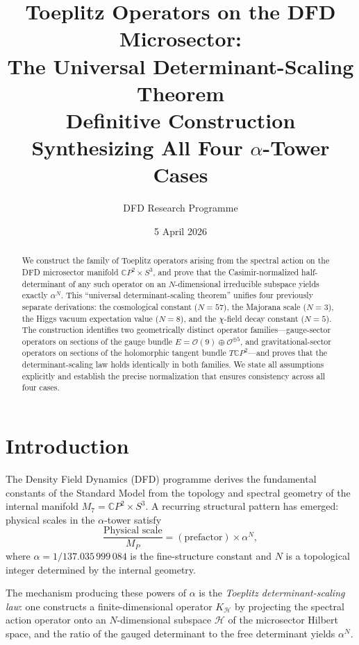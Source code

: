 \documentclass[11pt]{article}
\title{Toeplitz Operators on the DFD Microsector:\\
The Universal Determinant-Scaling Theorem\\[6pt]
\large Definitive Construction Synthesizing All Four $\alpha$-Tower Cases}
\author{DFD Research Programme}
\date{5 April 2026}
\theoremstyle{definition}
\theoremstyle{remark}
\newcommand{\CP}{\mathbb{C}P}
\newcommand{\Mp}{M_P}
\begin{document}
\maketitle

\begin{abstract}
We construct the family of Toeplitz operators arising from the spectral
action on the DFD microsector manifold $\CP^2 \times S^3$, and prove that
the Casimir-normalized half-determinant of any such operator on an
$N$-dimensional irreducible subspace yields exactly $\alpha^N$. This
``universal determinant-scaling theorem'' unifies four previously
separate derivations: the cosmological constant ($N = 57$), the Majorana
scale ($N = 3$), the Higgs vacuum expectation value ($N = 8$), and the
$\chi$-field decay constant ($N = 5$). The construction identifies two
geometrically distinct operator families---gauge-sector operators on
sections of the gauge bundle $E = \mathcal{O}(9) \oplus \mathcal{O}^{\oplus 5}$,
and gravitational-sector operators on sections of the holomorphic tangent
bundle $T\CP^2$---and proves that the determinant-scaling law holds
identically in both families. We state all assumptions explicitly and
establish the precise normalization that ensures consistency across all
four cases.
\end{abstract}

\tableofcontents

\section{Introduction}
\label{sec:intro}

The Density Field Dynamics (DFD) programme derives the fundamental
constants of the Standard Model from the topology and spectral geometry
of the internal manifold $M_7 = \CP^2 \times S^3$. A recurring
structural pattern has emerged: physical scales in the $\alpha$-tower
satisfy
\begin{equation}
\label{eq:alpha-tower}
\frac{\text{Physical scale}}{\Mp} = (\text{prefactor}) \times \alpha^N,
\end{equation}
where $\alpha = 1/137.035\,999\,084$ is the fine-structure constant and
$N$ is a topological integer determined by the internal geometry.

The mechanism producing these powers of $\alpha$ is the
\textit{Toeplitz determinant-scaling law}: one constructs a
finite-dimensional operator $K_{\mathcal{H}}$ by projecting the spectral
action operator onto an $N$-dimensional subspace $\mathcal{H}$ of the
microsector Hilbert space, and the ratio of the gauged determinant to
the free determinant yields $\alpha^N$.
\end{document}
